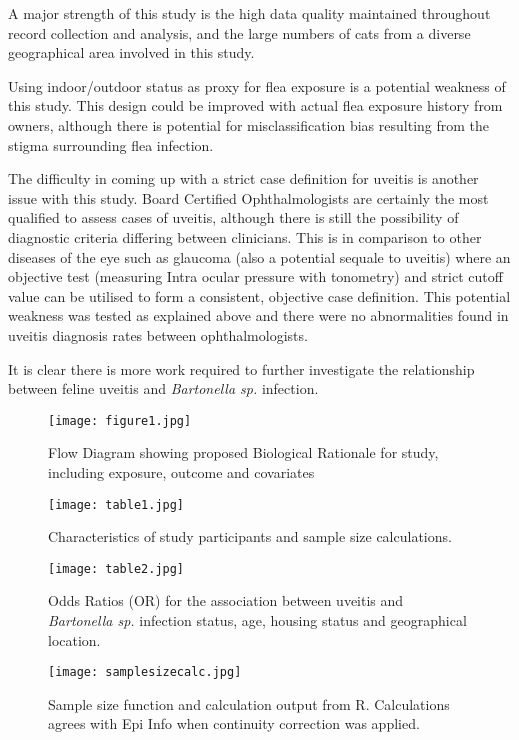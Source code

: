 \documentclass[11pt,twocolumn]{article}
\begin{document}
		A major strength of this study is the high data quality maintained throughout record collection and analysis, and the large numbers of cats from a diverse geographical area involved in this study.


		Using indoor/outdoor status as proxy for flea exposure is a potential weakness of this study. 
		This design could be improved with actual flea exposure history from owners, although there is potential for misclassification bias resulting from the stigma surrounding flea infection.
		
		
		The difficulty in coming up with a strict case definition for uveitis is another issue with this study. 
		Board Certified Ophthalmologists are certainly the most qualified to assess cases of uveitis, although there is still the possibility of diagnostic criteria differing between clinicians. 
		This is in comparison to other diseases of the eye such as glaucoma (also a potential sequale to uveitis) where an objective test (measuring Intra ocular pressure with tonometry) and strict cutoff value can be utilised to form a consistent, objective case definition.
		This potential weakness was tested as explained above and there were no abnormalities found in uveitis diagnosis rates between ophthalmologists.


		It is clear there is more work required to further investigate the relationship between feline uveitis and \emph{Bartonella sp.} infection.
\newpage
\begin{figure*}[h!]
	\centering
	\texttt{[image: figure1.jpg]}
	\caption{Flow Diagram showing proposed Biological Rationale for study, including exposure, outcome and covariates }
	\label{fig:1}
\end{figure*}

\begin{figure*}[h!]
	\centering
	\texttt{[image: table1.jpg]}
	\caption{Characteristics of study participants and sample size calculations.}
	\label{tab:1}
\end{figure*}
 
\begin{figure*}[h!]
	\centering
	\texttt{[image: table2.jpg]}
	\caption{Odds Ratios (OR) for the association between uveitis and \emph{Bartonella sp.} infection status, age, housing status and geographical location.}
	\label{tab:2}
\end{figure*}

\begin{figure*}[h!]
	\centering
	\texttt{[image: samplesizecalc.jpg]}
	\caption{Sample size function and calculation output from R. Calculations agrees with Epi Info when continuity correction was applied.}
	\label{fig:samplesizecalc}
\end{figure*}

\clearpage


\end{document}

